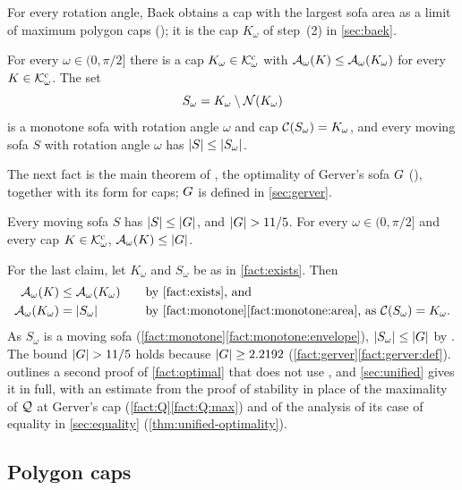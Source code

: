For every rotation angle, Baek obtains a cap with the largest sofa area as a
limit of maximum polygon caps (); it is the cap
$K_\omega$ of step~(2) in \cref{sec:baek}.

\begin{fact}\label{fact:exists}
For every $\omega\in(0,\pi/2]$ there is a cap $K_\omega\in\mathcal{K}^{\mathrm{c}}_\omega$ with
$\mathcal{A}_\omega(K)\le\mathcal{A}_\omega(K_\omega)$ for every $K\in\mathcal{K}^{\mathrm{c}}_\omega$. The set
\[
  S_\omega=K_\omega\setminus\mathcal{N}(K_\omega)
\]
is a monotone sofa with rotation angle $\omega$ and cap
$\mathcal{C}(S_\omega)=K_\omega$, and every moving sofa $S$ with rotation angle $\omega$
has $\lvert S\rvert\le\lvert S_\omega\rvert$. 
\end{fact}

The next fact is the main theorem of \cite{Baek}, the optimality of Gerver's
sofa $G$ (), together with its form for caps; $G$ is
defined in \cref{sec:gerver}.

\begin{fact}[optimality]\label{fact:optimal}
Every moving sofa $S$ has $\lvert S\rvert\le\lvert G\rvert$, and $\lvert G\rvert>11/5$. For every
$\omega\in(0,\pi/2]$ and every cap $K\in\mathcal{K}^{\mathrm{c}}_\omega$, $\mathcal{A}_\omega(K)\le\lvert G\rvert$.
\end{fact}

For the last claim, let $K_\omega$ and $S_\omega$ be as in \cref{fact:exists}.
Then
\begin{alignat*}{2}
  \cA_\omega(K)&\le\cA_\omega(K_\omega)&\quad&
    \text{by \cref{fact:exists}, and}\\
  \cA_\omega(K_\omega)&=\abs{S_\omega}&&\text{by
    \cref{fact:monotone}\ref{fact:monotone:area}, as $\cC(S_\omega)=K_\omega$.}
\end{alignat*}
As
$S_\omega$ is a moving sofa (\cref{fact:monotone}\ref{fact:monotone:envelope}),
$\lvert S_\omega\rvert\le\lvert G\rvert$ by . The bound $\lvert G\rvert>11/5$ holds
because $\lvert G\rvert\ge2.2192$ (\cref{fact:gerver}\ref{fact:gerver:def}).
 outlines a second proof of \cref{fact:optimal} that does not
use , and \cref{sec:unified} gives it in full, with an
estimate from the proof of stability in place of the maximality of $\mathcal{Q}$ at
Gerver's cap (\cref{fact:Q}\ref{fact:Q:max}) and of the analysis of its case of
equality in \cref{sec:equality}
(\cref{thm:unified-optimality}).

\subsection{Polygon caps}\label{sec:polygon}

